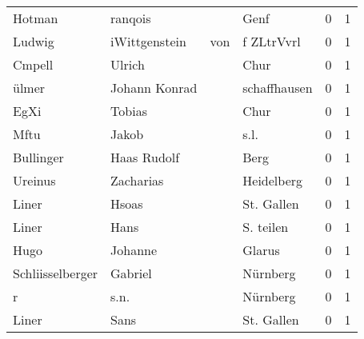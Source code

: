 \documentclass[10pt,a4paper,landscape]{article}
\begin{document}
\begin{longtable}{llllrr}
                   Hotman &                            ranqois &             &                                        Genf &          0 &         1 \\
                   Ludwig &                      iWittgenstein &         von &                                  f ZLtrVvrl &          0 &         1 \\
                   Cmpell &                             Ulrich &             &                                        Chur &          0 &         1 \\
                    ülmer &                      Johann Konrad &             &                                schaffhausen &          0 &         1 \\
                     EgXi &                             Tobias &             &                                        Chur &          0 &         1 \\
                     Mftu &                              Jakob &             &                                        s.l. &          0 &         1 \\
                Bullinger &                        Haas Rudolf &             &                                        Berg &          0 &         1 \\
                  Ureinus &                          Zacharias &             &                                  Heidelberg &          0 &         1 \\
                    Liner &                              Hsoas &             &                                  St. Gallen &          0 &         1 \\
                    Liner &                               Hans &             &                                   S. teilen &          0 &         1 \\
                     Hugo &                            Johanne &             &                                      Glarus &          0 &         1 \\
         Schliisselberger &                            Gabriel &             &                                    Nürnberg &          0 &         1 \\
                        r &                               s.n. &             &                                    Nürnberg &          0 &         1 \\
                    Liner &                               Sans &             &                                  St. Gallen &          0 &         1 \\

\end{longtable}
\end{document}
